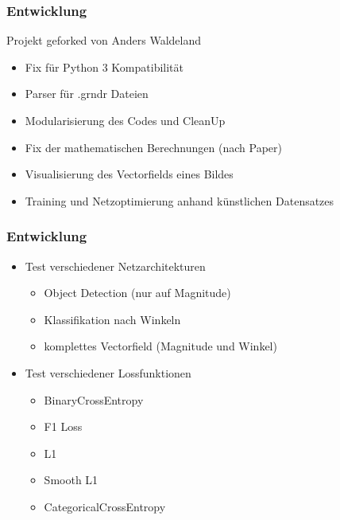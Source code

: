 \begin{frame}
	\frametitle{Entwicklung}
	Projekt geforked von Anders Waldeland
	\begin{itemize}
		\item Fix für Python 3 Kompatibilität
		\item Parser für .grndr Dateien
		\item Modularisierung des Codes und CleanUp
		\item Fix der mathematischen Berechnungen (nach Paper)
		\item Visualisierung des Vectorfields eines Bildes
		\item Training und Netzoptimierung anhand künstlichen Datensatzes
	\end{itemize}
\end{frame}

\begin{frame}
	\frametitle{Entwicklung}
	\begin{itemize}
		\item Test verschiedener Netzarchitekturen
		\begin{itemize}
			\item Object Detection (nur auf Magnitude)
			\item Klassifikation nach Winkeln
			\item komplettes Vectorfield (Magnitude und Winkel)
		\end{itemize}
		\item Test verschiedener Lossfunktionen
		\begin{itemize}
			\item BinaryCrossEntropy
			\item F1 Loss
			\item L1
			\item Smooth L1
			\item CategoricalCrossEntropy
		\end{itemize}
	\end{itemize}
\end{frame}

